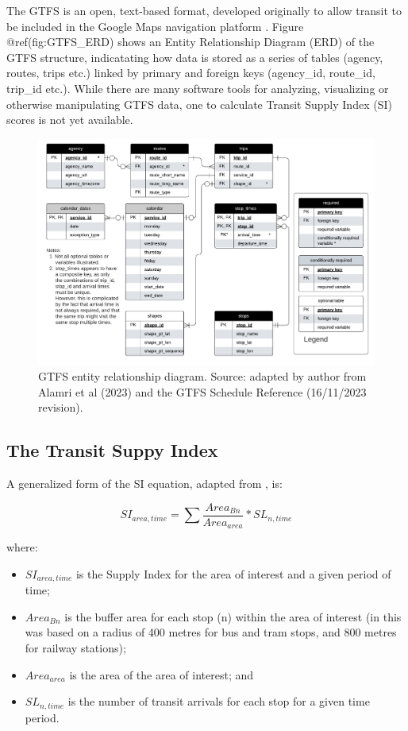 \documentclass[preprint, 3p,
authoryear]{elsarticle} %
\begin{document}
The GTFS is an open, text-based format, developed originally to allow
transit to be included in the Google Maps navigation platform
\citep{GTFS}. Figure @ref(fig:GTFS\_ERD) shows an Entity Relationship
Diagram (ERD) of the GTFS structure, indicatating how data is stored as
a series of tables (agency, routes, trips etc.) linked by primary and
foreign keys (agency\_id, route\_id, trip\_id etc.). While there are
many software tools for analyzing, visualizing or otherwise manipulating
GTFS data, one to calculate Transit Supply Index (SI) scores is not yet
available.

\begin{figure}
\includegraphics[width=1\linewidth]{graphics/GTFS} \caption{GTFS entity relationship diagram. Source: adapted by author from Alamri et al (2023) and the GTFS Schedule Reference (16/11/2023 revision).}\label{fig:GTFS_ERD}
\end{figure}

\subsection{The Transit Suppy Index}\label{the-transit-suppy-index}

A generalized form of the SI equation, adapted from
\citet{currie2010identifying}, is:

\[SI_{area, time} = \sum{\frac{Area_{Bn}}{Area_{area}}*SL_{n, time}}\]

where:

\begin{itemize}
\item
  \(SI_{area, time}\) is the Supply Index for the area of interest and a
  given period of time;
\item
  \(Area_{Bn}\) is the buffer area for each stop (n) within the area of
  interest (in \citet{currie2010identifying} this was based on a radius
  of 400 metres for bus and tram stops, and 800 metres for railway
  stations);
\item
  \(Area_{area}\) is the area of the area of interest; and
\item
  \(SL_{n,time}\) is the number of transit arrivals for each stop for a
  given time period.
\end{itemize}
\end{document}

